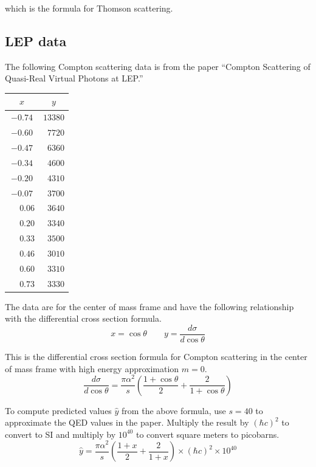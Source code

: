 \documentclass[12pt]{article}
\begin{document}
\noindent
which is the formula for Thomson scattering.

\subsection*{LEP data}

The following Compton scattering data is from the paper
``Compton Scattering of Quasi-Real Virtual Photons at LEP.''

\begin{center}
\begin{tabular}{|c|c|}
\hline
$x$ & $y$\\
\hline
$-0.74$ & $13380$\\
$-0.60$ & $\phantom{0}7720$\\
$-0.47$ & $\phantom{0}6360$\\
$-0.34$ & $\phantom{0}4600$\\
$-0.20$ & $\phantom{0}4310$\\
$-0.07$ & $\phantom{0}3700$\\
$\phantom{+}0.06$ & $\phantom{0}3640$\\
$\phantom{+}0.20$ & $\phantom{0}3340$\\
$\phantom{+}0.33$ & $\phantom{0}3500$\\
$\phantom{+}0.46$ & $\phantom{0}3010$\\
$\phantom{+}0.60$ & $\phantom{0}3310$\\
$\phantom{+}0.73$ & $\phantom{0}3330$\\
\hline
\end{tabular}
\end{center}

\noindent
The data are for the center of mass frame and have the following relationship with the differential cross section formula.
\begin{equation*}
x=\cos\theta\qquad y=\frac{d\sigma}{d\cos\theta}
\end{equation*}

\noindent
This is the differential cross section formula for Compton scattering
in the center of mass frame with high energy approximation $m=0$.
\begin{equation*}
\frac{d\sigma}{d\cos\theta}
=\frac{\pi\alpha^2}{s}\left(
\frac{1+\cos\theta}{2}+\frac{2}{1+\cos\theta}
\right)
\end{equation*}

\noindent
To compute predicted values $\hat{y}$ from the above formula,
use $s=40$ to approximate the QED values in the paper.
Multiply the result by $(\hbar c)^2$ to convert to SI
and multiply by $10^{40}$ to convert square meters to picobarns.
\begin{equation*}
\hat{y}
=
\frac{\pi\alpha^2}{s}
\left(
\frac{1+x}{2}+
\frac{2}{1+x}
\right)
\times(\hbar c)^2
\times10^{40}
\end{equation*}
\end{document}
